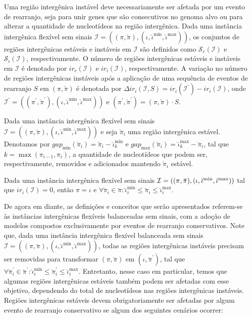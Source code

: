 Uma região intergênica instável deve necessariamente ser afetada por um evento de rearranjo, seja para unir genes que são consecutivos no genoma alvo ou para alterar a quantidade de nucleotídeos na região intergênica. Dada uma instância intergênica flexível sem sinais $\mathcal{I} = ((\pi,\breve\pi),(\iota,\breve\iota^{\min},\breve\iota^{\max}))$, os conjuntos de regiões intergênicas estáveis e instáveis em $\mathcal{I}$ são definidos como $\mathcal{S}_e(\mathcal{I})$ e $\mathcal{S}_i(\mathcal{I})$, respectivamente. O número de regiões intergênicas estáveis e instáveis em $\mathcal{I}$ é denotado por $ir_e(\mathcal{I})$ e $ir_i(\mathcal{I})$, respectivamente. A variação no número de regiões intergênicas instáveis após a aplicação de uma sequência de eventos de rearranjo $S$ em $(\pi,\breve\pi)$ é denotada por  $\Delta ir_i(\mathcal{I},S) = ir_i(\mathcal{I}^{\prime}) - ir_i(\mathcal{I})$, onde $\mathcal{I}^{\prime} = ((\pi^{\prime}, \breve\pi^{\prime}),(\iota,\breve\iota^{\min},\breve\iota^{\max}))$ e $(\pi^{\prime}, \breve\pi^{\prime}) = (\pi, \breve\pi) \cdot S$.

Dada uma instância intergênica flexível sem sinais $\mathcal{I} = ((\pi,\breve\pi),(\iota,\breve\iota^{\min},\breve\iota^{\max}))$ e seja $\breve\pi_i$ uma região intergênica estável. Denotamos por $gap_{\min}(\breve\pi_i) = \breve\pi_i - \breve\iota^{\min}_k$ e $gap_{\max}(\breve\pi_i) = \breve\iota^{\max}_k - \breve\pi_i$, tal que $k = \max(\pi_{i-1}, \pi_i)$, a quantidade de nucleotídeos que podem ser, respectivamente, removidos e adicionados mantendo $\breve\pi_i$ estável.

\begin{remark}\label{remark:EUSNDMWS}
Dada uma instância intergênica flexível sem sinais $\mathcal{I} = ((\pi,\breve\pi),\break(\iota,\breve\iota^{\min},\breve\iota^{\max}))$ tal que $ir_i(\mathcal{I}) = 0$, então $\pi = \iota$ e $\forall \breve\pi_i \in \breve\pi: \breve\iota^{\min}_i \le \breve\pi_i \le \breve\iota^{\max}_i$.
\end{remark}

De agora em diante, as definições e conceitos que serão apresentados referem-se às instâncias intergênicas flexíveis balanceadas sem sinais, com a adoção de modelos compostos exclusivamente por eventos de rearranjo conservativos. Note que, dada uma instância intergênica flexível balanceada sem sinais $\mathcal{I} = ((\pi,\breve\pi),(\iota,\breve\iota^{\min},\breve\iota^{\max}))$, todas as regiões intergênicas instáveis precisam ser removidas para transformar $(\pi,\breve\pi)$ em $(\iota,\breve\pi^{\prime})$, tal que $\forall \breve\pi^{\prime}_i \in \breve\pi^{\prime} : \breve\iota^{\min}_i \le \breve\pi^{\prime}_i \le \breve\iota^{\max}_i$. Entretanto, nesse caso em particular, temos que algumas regiões intergênicas estáveis também podem ser afetadas com esse objetivo, dependendo do total de nucleotídeos nas regiões intergênicas instáveis. Regiões intergênicas estáveis devem obrigatoriamente ser afetadas por algum evento de rearranjo conservativo se algum dos seguintes cenários ocorrer:

